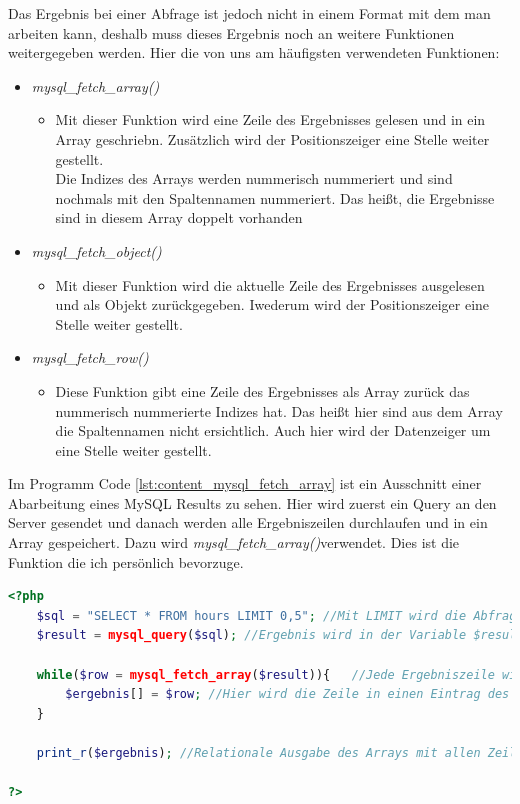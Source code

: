 Das Ergebnis bei einer Abfrage ist jedoch nicht in einem Format mit dem man arbeiten kann, deshalb muss dieses Ergebnis noch an weitere Funktionen weitergegeben werden. Hier die von uns am häufigsten verwendeten Funktionen:
\begin{itemize}
	\item \textit{mysql\_fetch\_array()}
	\begin{itemize}
		\item Mit dieser Funktion wird eine Zeile des Ergebnisses gelesen und in ein Array geschriebn. Zusätzlich wird der Positionszeiger eine Stelle weiter gestellt.\\
		Die Indizes des Arrays werden nummerisch nummeriert und sind nochmals mit den Spaltennamen nummeriert. Das heißt, die Ergebnisse sind in diesem Array doppelt vorhanden 
	\end{itemize}
	\item \textit{mysql\_fetch\_object()}
		\begin{itemize}
			\item Mit dieser Funktion wird die aktuelle Zeile des Ergebnisses ausgelesen und als Objekt zurückgegeben. Iwederum wird der Positionszeiger eine Stelle weiter gestellt.
		\end{itemize}
	\item \textit{mysql\_fetch\_row()}
		\begin{itemize}
			\item Diese Funktion gibt eine Zeile des Ergebnisses als Array zurück das nummerisch nummerierte Indizes hat. Das heißt hier sind aus dem Array die Spaltennamen nicht ersichtlich. Auch hier wird der Datenzeiger um eine Stelle weiter gestellt.
		\end{itemize}
\end{itemize}
Im Programm Code \ref{lst:content_mysql_fetch_array} ist ein Ausschnitt einer Abarbeitung eines MySQL Results zu sehen. Hier wird zuerst ein Query an den Server gesendet und danach werden alle Ergebniszeilen durchlaufen und in ein Array gespeichert. Dazu wird \textit{mysql\_fetch\_array()}verwendet. Dies ist die Funktion die ich persönlich bevorzuge.\\
\begin{lstlisting}[style=custom, language=PHP, caption={MySQL Query weiterverarbeiten},label={lst:content_mysql_fetch_array}]
<?php 
	$sql = "SELECT * FROM hours LIMIT 0,5"; //Mit LIMIT wird die Abfrage auf die ersten 5 Ergebnisse begrenzt
	$result = mysql_query($sql); //Ergebnis wird in der Variable $result gespeichert
	
	while($row = mysql_fetch_array($result)){	//Jede Ergebniszeile wird durchlaufen
		$ergebnis[] = $row;	//Hier wird die Zeile in einen Eintrag des Arrays geschrieben
	}
	
	print_r($ergebnis);	//Relationale Ausgabe des Arrays mit allen Zeilen
	
?>
\end{lstlisting}
